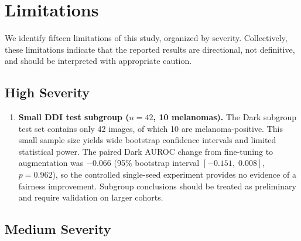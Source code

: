 \section{Limitations}

We identify fifteen limitations of this study, organized by severity. Collectively, these limitations indicate that the reported results are directional, not definitive, and should be interpreted with appropriate caution.

\subsection{High Severity}

\begin{enumerate}
    \item \textbf{Small DDI test subgroup ($n=42$, 10 melanomas).} The Dark subgroup test set contains only 42 images, of which 10 are melanoma-positive. This small sample size yields wide bootstrap confidence intervals and limited statistical power. The paired Dark AUROC change from fine-tuning to augmentation was $-0.066$ (95\% bootstrap interval $[-0.151,\;0.008]$, $p=0.962$), so the controlled single-seed experiment provides no evidence of a fairness improvement. Subgroup conclusions should be treated as preliminary and require validation on larger cohorts.
\end{enumerate}

\subsection{Medium Severity}


